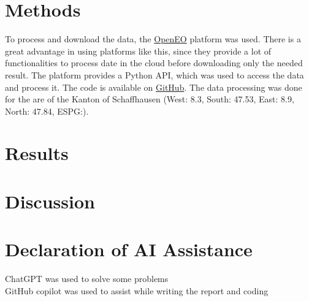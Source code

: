 \documentclass{article}
\begin{document}
\section*{Methods}

To process and download the data, the \href{https://openeo.dataspace.copernicus.eu/}{OpenEO} platform was used. There is a
great advantage in using platforms like this, since they provide a lot of functionalities to process date in the cloud
before downloading only the needed result. The platform provides a Python API, which was used to access the data and process it.
The code is available on \href{https://github.com/juliankraft/RemoteSensing_Task01}{GitHub}. The data processing was done for the are of the Kanton of Schaffhausen
(West: 8.3, South: 47.53, East: 8.9, North: 47.84, ESPG:). 

\section*{Results}


\section*{Discussion}


\vfill
\section*{Declaration of AI Assistance}
ChatGPT was used to solve some problems\\
GitHub copilot was used to assist while writing the report and coding
\end{document}
